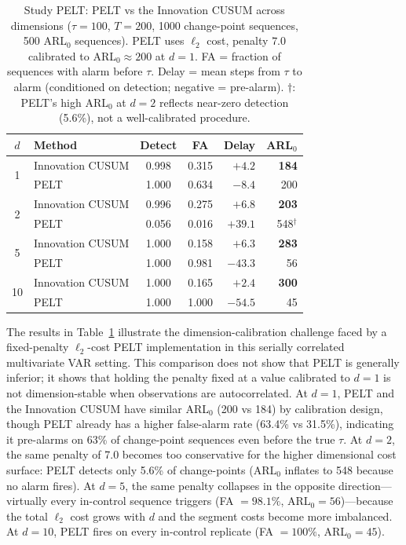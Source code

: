 \documentclass[bj,authoryear]{imsart}
\theoremstyle{plain}
\theoremstyle{definition}
\begin{document}
\begin{table}[t]
\centering
\caption{Study PELT: PELT vs the Innovation CUSUM across dimensions
  ($\tau=100$, $T=200$, 1000 change-point sequences, 500 ARL$_0$ sequences).
  PELT uses $\ell_2$ cost, penalty $7.0$ calibrated to ARL$_0 \approx 200$ at $d=1$.
  FA = fraction of sequences with alarm before $\tau$.
  Delay = mean steps from $\tau$ to alarm (conditioned on detection; negative = pre-alarm).
  $\dagger$: PELT's high ARL$_0$ at $d=2$ reflects near-zero detection (5.6\%),
  not a well-calibrated procedure.}
\label{tab:pelt}
\small
\begin{tabular}{clccrr}
\toprule
$d$ & Method & Detect & FA & Delay & ARL$_0$ \\
\midrule
\multirow{2}{*}{1}
  & Innovation CUSUM  & 0.998 & 0.315 & $+4.2$ & \textbf{184} \\
  & PELT       & 1.000 & 0.634 & $-8.4$ & 200 \\
\midrule
\multirow{2}{*}{2}
  & Innovation CUSUM  & 0.996 & 0.275 & $+6.8$ & \textbf{203} \\
  & PELT       & 0.056 & 0.016 & $+39.1$ & 548$^\dagger$ \\
\midrule
\multirow{2}{*}{5}
  & Innovation CUSUM  & 1.000 & 0.158 & $+6.3$ & \textbf{283} \\
  & PELT       & 1.000 & 0.981 & $-43.3$ & 56 \\
\midrule
\multirow{2}{*}{10}
  & Innovation CUSUM  & 1.000 & 0.165 & $+2.4$ & \textbf{300} \\
  & PELT       & 1.000 & 1.000 & $-54.5$ & 45 \\
\bottomrule
\end{tabular}
\end{table}

The results in Table~\ref{tab:pelt} illustrate the dimension-calibration
challenge faced by a fixed-penalty $\ell_2$-cost PELT implementation in
this serially correlated multivariate VAR setting.
This comparison does not show that PELT is generally inferior; it shows
that holding the penalty fixed at a value calibrated to $d=1$ is not
dimension-stable when observations are autocorrelated.
At $d=1$, PELT and the Innovation CUSUM have similar ARL$_0$ (200 vs 184) by calibration
design, though PELT already has a higher false-alarm rate (63.4\% vs 31.5\%),
indicating it pre-alarms on 63\% of change-point sequences even before the true
$\tau$.
At $d=2$, the same penalty of 7.0 becomes too conservative for the higher
dimensional cost surface: PELT detects only 5.6\% of change-points (ARL$_0$
inflates to 548 because no alarm fires). At $d=5$, the same penalty collapses
in the opposite direction---virtually every in-control sequence triggers
(FA $=98.1\%$, ARL$_0 =56$)---because the total $\ell_2$ cost grows with $d$
and the segment costs become more imbalanced.  At $d=10$, PELT fires on every
in-control replicate (FA $=100\%$, ARL$_0 =45$).
\end{document}
